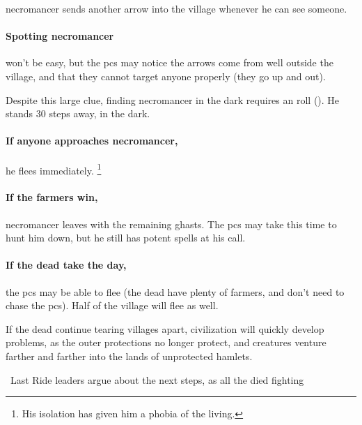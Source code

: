 \Gls{necromancer} sends another arrow into the \gls{village} whenever he can see someone.

\paragraph{Spotting \gls{necromancer}}
won't be easy, but the \glspl{pc} may notice the arrows come from well outside the \gls{village}, and that they cannot target anyone properly (they go up and out).

Despite this large clue, finding \gls{necromancer} in the dark requires an  roll (\tn[12]).
He stands 30 \glspl{step} away, in the dark.

\paragraph{If anyone approaches \gls{necromancer},}
he flees immediately.%
\footnote{His isolation has given him a phobia of the living.}

\paragraph{If the farmers win,}
\gls{necromancer} leaves with the remaining ghasts.
The \glspl{pc} may take this time to hunt him down, but he still has potent spells at his call.

\paragraph{If the dead take the day,}
the \glspl{pc} may be able to flee (the dead have plenty of farmers, and don't need to chase the \glspl{pc}).
Half of the \gls{village} will flee as well.

If the dead continue tearing \glspl{village} apart, civilization will quickly develop problems, as the outer protections no longer protect, and creatures venture farther and farther into the lands of unprotected hamlets.




{\squash\ Last Ride}%
{ leaders argue about the next steps, as all the  died fighting }%

